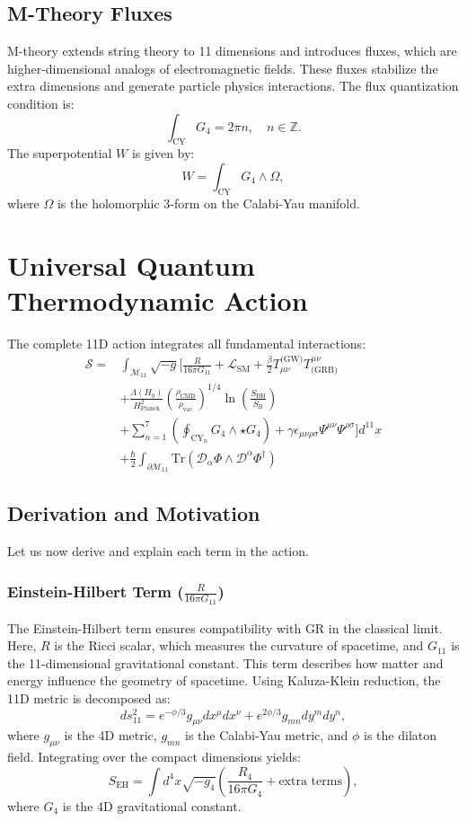 \documentclass[12pt, a4paper]{article}
\begin{document}
\subsection{M-Theory Fluxes}
M-theory extends string theory to 11 dimensions and introduces fluxes, which are higher-dimensional analogs of electromagnetic fields. These fluxes stabilize the extra dimensions and generate particle physics interactions. The flux quantization condition is:
\[
\int_{\text{CY}} G_4 = 2\pi n, \quad n \in \mathbb{Z}.
\]
The superpotential \(W\) is given by:
\[
W = \int_{\text{CY}} G_4 \wedge \Omega,
\]
where \(\Omega\) is the holomorphic 3-form on the Calabi-Yau manifold.

\section{Universal Quantum Thermodynamic Action}
The complete 11D action integrates all fundamental interactions:
\[
\boxed{
\begin{aligned}
\mathcal{S} = & \int_{\mathcal{M}_{11}} \sqrt{-g} \Bigg[ \frac{R}{16\pi G_{11}} + \mathcal{L}_{\text{SM}} + \frac{\beta}{2} T_{\mu\nu}^{\text{(GW)}} T^{\mu\nu}_{\text{(GRB)}} \\
& + \frac{\Lambda(H_0)}{H_{\text{Planck}}^2} \left( \frac{\rho_{\text{CMB}}}{\rho_{\text{vac}}} \right)^{1/4} \ln\left(\frac{S_{\text{BH}}}{S_{\text{B}}}\right) \\
& + \sum_{n=1}^7 \left( \oint_{\text{CY}_n} G_4 \wedge \star G_4 \right) + \gamma \epsilon_{\mu\nu\rho\sigma} \Psi^{\mu\nu} \Psi^{\rho\sigma} \Bigg] d^{11}x \\
& + \frac{\hbar}{2} \int_{\partial\mathcal{M}_{11}} \text{Tr}\left( \mathcal{D}_\alpha \Phi \wedge \mathcal{D}^\alpha \Phi^\dagger \right)
\end{aligned}
}
\]

\subsection{Derivation and Motivation}
Let us now derive and explain each term in the action.

\subsubsection{Einstein-Hilbert Term ($\frac{R}{16\pi G_{11}}$)}
The Einstein-Hilbert term ensures compatibility with GR in the classical limit. Here, \(R\) is the Ricci scalar, which measures the curvature of spacetime, and \(G_{11}\) is the 11-dimensional gravitational constant. This term describes how matter and energy influence the geometry of spacetime. Using Kaluza-Klein reduction, the 11D metric is decomposed as:
\[
ds^2_{11} = e^{-\phi/3} g_{\mu\nu}dx^\mu dx^\nu + e^{2\phi/3} g_{mn}dy^m dy^n,
\]
where \(g_{\mu\nu}\) is the 4D metric, \(g_{mn}\) is the Calabi-Yau metric, and \(\phi\) is the dilaton field. Integrating over the compact dimensions yields:
\[
S_{\text{EH}} = \int d^4x \sqrt{-g_4} \left( \frac{R_4}{16\pi G_4} + \text{extra terms} \right),
\]
where \(G_4\) is the 4D gravitational constant.
\end{document}
